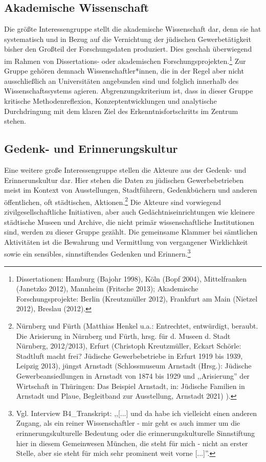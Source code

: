 \subsection{Akademische Wissenschaft}

Die größte Interessengruppe stellt die akademische Wissenschaft dar, denn sie hat systematisch und in Bezug auf die Vernichtung der jüdischen Gewerbetätigkeit  bisher den Großteil der Forschungsdaten produziert. Dies geschah überwiegend im Rahmen von Dissertations- oder akademischen Forschungsprojekten.\footnote{Dissertationen: Hamburg (Bajohr 1998), Köln (Bopf 2004), Mittelfranken (Janetzko 2012), Mannheim (Fritsche 2013); Akademische Forschungsprojekte: Berlin (Kreutzmüller 2012), Frankfurt am Main (Nietzel 2012), Breslau (2012).} Zur Gruppe gehören demnach Wissenschaftler*innen, die in der Regel aber nicht ausschließlich an Universitäten angebunden sind und folglich innerhalb des Wissenschaftssystems agieren. Abgrenzungskriterium ist, dass in dieser Gruppe kritische Methodenreflexion, Konzeptentwicklungen und analytische Durchdringung mit dem klaren Ziel des Erkenntnisfortschritts im Zentrum stehen. 

\subsection{Gedenk- und Erinnerungskultur}

Eine weitere große Interessengruppe stellen die Akteure aus der Gedenk- und Erinnerunskultur dar. Hier stehen die Daten zu jüdischen Gewerbebetrieben meist im Kontext von Ausstellungen, Stadtführern, Gedenkbüchern und anderen öffentlichen, oft städtischen, Aktionen.\footnote{Nürnberg und Fürth (Matthias Henkel u.a.: Entrechtet, entwürdigt, beraubt. Die Arisierung in Nürnberg und Fürth, hrsg. für d. Museen d. Stadt Nürnberg, 2012/2013), Erfurt (Christoph Kreutzmüller, Eckart Schörle: Stadtluft macht frei? Jüdische Gewerbebetriebe in Erfurt 1919 bis 1939, Leipzig 2013), jüngst Arnstadt (Schlossmuseum Arnstadt (Hrsg.): Jüdische Gewerbeansiedlungen in Arnstadt von 1874 bis 1929 und ,,Arisierung'' der Wirtschaft in Thüringen: Das Beispiel Arnstadt, in: Jüdische Familien in Arnstadt und Plaue, Begleitband zur Ausstellung, Arnstadt 2021)
).} Die Akteure sind vorwiegend zivilgesellschaftliche Initiativen, aber auch Gedächtniseinrichtungen wie kleinere städtische Museen und Archive, die nicht primär wissenschaftliche Institutionen sind, werden zu dieser Gruppe gezählt. Die gemeinsame Klammer bei sämtlichen Aktivitäten ist die Bewahrung und Vermittlung von vergangener Wirklichkeit sowie ein sensibles, sinnstiftendes Gedenken und Erinnern.\footnote{Vgl. Interview B4\_Transkript: ,,[...] und da habe ich vielleicht einen anderen Zugang, als ein reiner Wissenschaftler - mir geht es auch immer um die erinnerungskulturelle Bedeutung oder die erinnerungskulturelle Sinnstiftung hier in diesem Gemeinwesen München, die steht für mich - nicht an erster Stelle, aber sie steht für mich sehr prominent weit vorne [...]''.}


